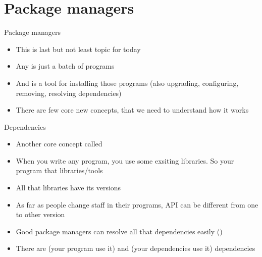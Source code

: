 \documentclass[usenames,dvipsnames,10pt,aspectratio=169]{beamer}
\begin{document}
\section{Package managers}
\begin{frame}{Package managers}
    \begin{itemize}
        \item This is last but not least topic for today
        \item Any  is just a batch of programs
        \item And  is a tool for installing those programs (also upgrading, configuring, removing, resolving dependencies)
        \item There are few core new concepts, that we need to understand how it works
    \end{itemize}
\end{frame}



\begin{frame}{Dependencies}
    \begin{itemize}
        \item Another core concept called 
        \item When you write any program, you use some exsiting libraries. So your program  that libraries/tools
        \item All that libraries have its versions
        \item As far as people change staff in their programs, API can be different from one to other version
        \item Good package managers can resolve all that dependencies easily ()
        \item There are  (your program use it) and  (your dependencies use it) dependencies
    \end{itemize}
\end{frame}
\end{document}

